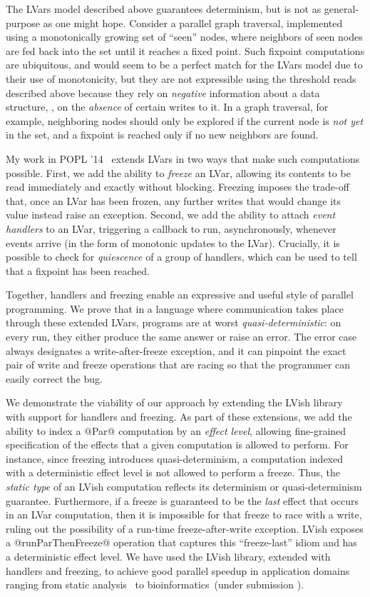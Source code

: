 \documentclass{article}
\begin{document}
The LVars model described above guarantees determinism, but is not as
general-purpose as one might hope.  Consider a parallel graph
traversal, implemented using a monotonically growing set of ``seen''
nodes, where neighbors of seen nodes are fed back into the set until
it reaches a fixed point.  Such fixpoint computations are ubiquitous,
and would seem to be a perfect match for the LVars model due to their
use of monotonicity, but they are not expressible using the threshold
reads described above because they rely on \emph{negative} information
about a data structure, \ie, on the \emph{absence} of certain writes
to it.  In a graph traversal, for example, neighboring nodes should
only be explored if the current node is \emph{not yet} in the set, and
a fixpoint is reached only if no new neighbors are found.

My work in POPL '14~\cite{Freeze-paper, Freeze-TR} extends LVars in
two ways that make such computations possible.  First, we add the
ability to \emph{freeze} an LVar, allowing its contents to be read
immediately and exactly without blocking. Freezing imposes the
trade-off that, once an LVar has been frozen, any further writes that
would change its value instead raise an exception.  Second, we add the
ability to attach \emph{event handlers} to an LVar, triggering a
callback to run, asynchronously, whenever events arrive (in the form
of monotonic updates to the LVar).  Crucially, it is possible to check
for \emph{quiescence} of a group of handlers, which can be used to
tell that a fixpoint has been reached.

Together, handlers and freezing enable an expressive and useful style
of parallel programming.  We prove that in a language where
communication takes place through these extended LVars, programs are
at worst \emph{quasi-deterministic}: on every run, they either produce
the same answer or raise an error.  The error case always designates a
write-after-freeze exception, and it can pinpoint the exact pair of
write and freeze operations that are racing so that the programmer can
easily correct the bug.

We demonstrate the viability of our approach by extending the LVish
library with support for handlers and freezing.  As part of these
extensions, we add the ability to index a @Par@ computation by an
\emph{effect level}, allowing fine-grained specification of the
effects that a given computation is allowed to perform.  For instance,
since freezing introduces quasi-determinism, a computation indexed
with a deterministic effect level is not allowed to perform a freeze.
Thus, the \emph{static type} of an LVish computation reflects its
determinism or quasi-determinism guarantee.  Furthermore, if a freeze
is guaranteed to be the \emph{last} effect that occurs in an LVar
computation, then it is impossible for that freeze to race with a
write, ruling out the possibility of a run-time freeze-after-write
exception.  LVish exposes a @runParThenFreeze@ operation that captures
this ``freeze-last'' idiom and has a deterministic effect level.  We
have used the LVish library, extended with handlers and freezing, to
achieve good parallel speedup in application domains ranging from
static analysis~\cite{Freeze-paper} to bioinformatics~(under
submission \cite{effectzoo-draft}).
\end{document}
